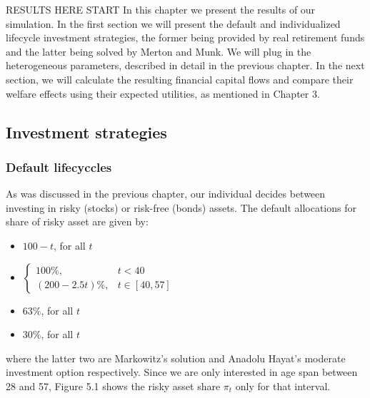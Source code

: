 \documentclass[]{elsarticle}
\begin{document}
RESULTS HERE START In this chapter we present the results of our simulation. In the first section we will present the default and individualized lifecycle investment strategies, the former being provided by real retirement funds and the latter being solved by Merton and Munk. We will plug in the heterogeneous parameters, described in detail in the previous chapter. In the next section, we will calculate the resulting financial capital flows and compare their welfare effects using their expected utilities, as mentioned in Chapter 3. 

\subsection{Investment strategies}
\subsubsection{Default lifecyccles}
As was discussed in the previous chapter, our individual decides between investing in risky (stocks) or risk-free (bonds) assets. The default allocations for share of risky asset are given by:

\begin{itemize}
	\item $100-t$, for all $t$
	\item $\begin{cases} 100\%, & t<40\\(200-2.5t)\%, & t\in[40,57]\end{cases}$
	\item $63\%$, for all $t$
	\item $30\%$, for all $t$
\end{itemize}

where the latter two are Markowitz's solution and Anadolu Hayat's moderate investment option respectively. Since we are only interested in age span between 28 and 57, Figure 5.1 shows the risky asset share $\pi_t$ only for that interval. 
\end{document}
